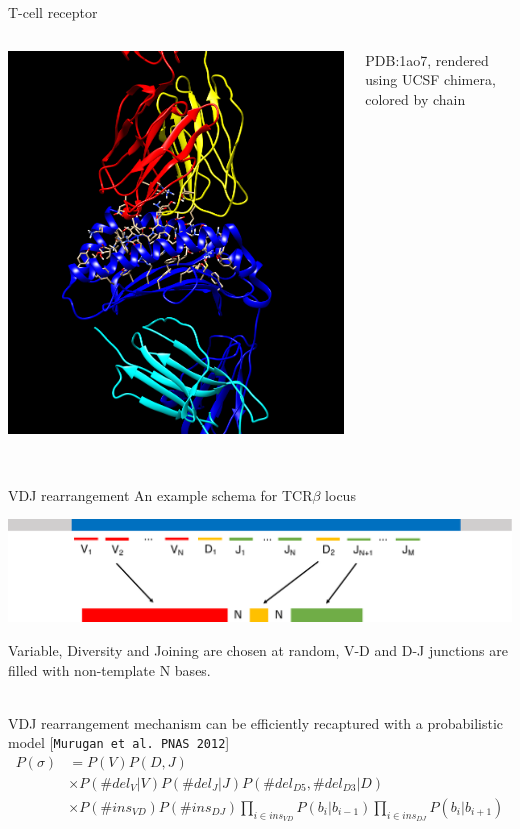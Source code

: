 \documentclass[12pt]{beamer}
\begin{document}
\begin{frame}{T-cell receptor}
\begin{columns}
\includegraphics[scale=0.13]{p2}\\~\

PDB:1ao7, rendered using UCSF chimera, colored by chain

\end{columns}
\end{frame}

\begin{frame}{VDJ rearrangement}
An example schema for TCR$\beta$ locus
\begin{center}
\includegraphics[width=\textwidth]{p3}
\end{center}
Variable, Diversity and Joining are chosen at random, V-D and D-J junctions are filled with non-template N bases. \\~\

\pause
VDJ rearrangement mechanism can be efficiently recaptured with a probabilistic model [\texttt{Murugan et al. PNAS 2012}]
\begin{equation*}
\begin{split}
P\left(\sigma\right) &= P(V)P(D,J) \\
 &\times P(\#del_V|V)P(\#del_J|J)P(\#del_{D5},\#del_{D3}|D) \\
 &\times P(\#ins_{VD})P(\#ins_{DJ})\prod_{i \in ins_{VD}} P(b_i|b_{i-1})\prod_{i \in ins_{DJ}} P(b_i|b_{i+1})
\end{split}
\end{equation*}
\end{frame}
\end{document}
